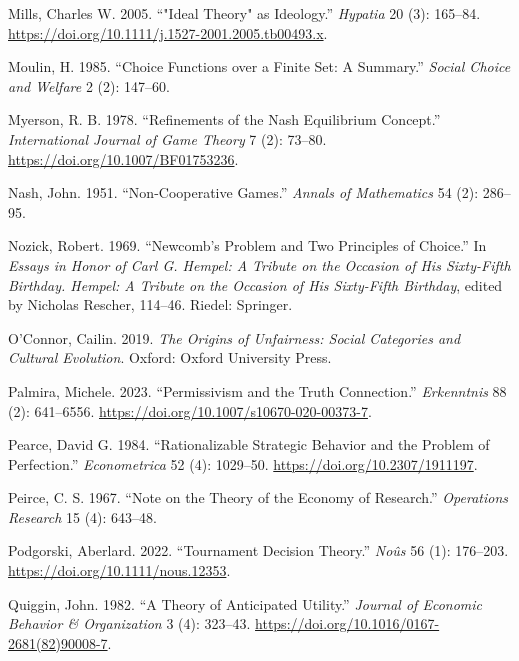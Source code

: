 \documentclass[
  12pt,
  letterpaper,
  DIV=11,
  numbers=noendperiod]{scrreprt}
\newlength{\cslhangindent}
\newenvironment{CSLReferences}[2] %
 {\begin{list}{}{%
  \setlength{\itemindent}{0pt}
  \setlength{\leftmargin}{0pt}
  \setlength{\parsep}{0pt}
  \ifodd #1
   \setlength{\leftmargin}{\cslhangindent}
   \setlength{\itemindent}{-1\cslhangindent}
  \fi
  \setlength{\itemsep}{#2\baselineskip}}}
 {\end{list}}
\begin{document}
\begin{CSLReferences}{1}{0}
Mills, Charles W. 2005. {``"Ideal Theory" as Ideology.''} \emph{Hypatia}
20 (3): 165--84.
\url{https://doi.org/10.1111/j.1527-2001.2005.tb00493.x}.

Moulin, H. 1985. {``Choice Functions over a Finite Set: A Summary.''}
\emph{Social Choice and Welfare} 2 (2): 147--60.

Myerson, R. B. 1978. {``Refinements of the Nash Equilibrium Concept.''}
\emph{International Journal of Game Theory} 7 (2): 73--80.
\url{https://doi.org/10.1007/BF01753236}.

Nash, John. 1951. {``Non-Cooperative Games.''} \emph{Annals of
Mathematics} 54 (2): 286--95.

Nozick, Robert. 1969. {``Newcomb's Problem and Two Principles of
Choice.''} In \emph{Essays in Honor of Carl {G}. Hempel: A Tribute on
the Occasion of His Sixty-Fifth Birthday. Hempel: A Tribute on the
Occasion of His Sixty-Fifth Birthday}, edited by Nicholas Rescher,
114--46. Riedel: Springer.

O'Connor, Cailin. 2019. \emph{The Origins of Unfairness: Social
Categories and Cultural Evolution}. Oxford: {O}xford {U}niversity
{P}ress.

Palmira, Michele. 2023. {``Permissivism and the Truth Connection.''}
\emph{Erkenntnis} 88 (2): 641--6556.
\url{https://doi.org/10.1007/s10670-020-00373-7}.

Pearce, David G. 1984. {``Rationalizable Strategic Behavior and the
Problem of Perfection.''} \emph{Econometrica} 52 (4): 1029--50.
\url{https://doi.org/10.2307/1911197}.

Peirce, C. S. 1967. {``Note on the Theory of the Economy of Research.''}
\emph{Operations Research} 15 (4): 643--48.

Podgorski, Aberlard. 2022. {``Tournament Decision Theory.''}
\emph{No{û}s} 56 (1): 176--203.
\url{https://doi.org/10.1111/nous.12353}.

Quiggin, John. 1982. {``A Theory of Anticipated Utility.''}
\emph{Journal of Economic Behavior \& Organization} 3 (4): 323--43.
\url{https://doi.org/10.1016/0167-2681(82)90008-7}.


\end{CSLReferences}
\end{document}
